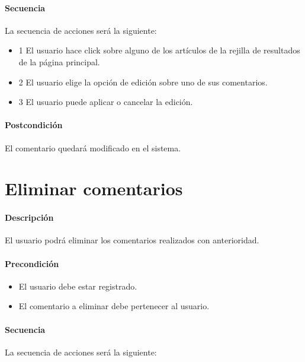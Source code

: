 \paragraph{Secuencia} La secuencia de acciones será la siguiente:

\begin{itemize}
	\item 1 El usuario hace click sobre alguno de los artículos de la rejilla de resultados de la página principal.
	\item 2 El usuario elige la opción de edición sobre uno de sus comentarios.
	\item 3 El usuario puede aplicar o cancelar la edición.
\end{itemize}

\paragraph{Postcondición} El comentario quedará modificado en el sistema.


\section{Eliminar comentarios}

\paragraph{Descripción} El usuario podrá eliminar los comentarios realizados con anterioridad.

\paragraph{Precondición} 
\begin{itemize}
	\item El usuario debe estar registrado.
	\item El comentario a eliminar debe pertenecer al usuario.
\end{itemize}

\paragraph{Secuencia} La secuencia de acciones será la siguiente:

